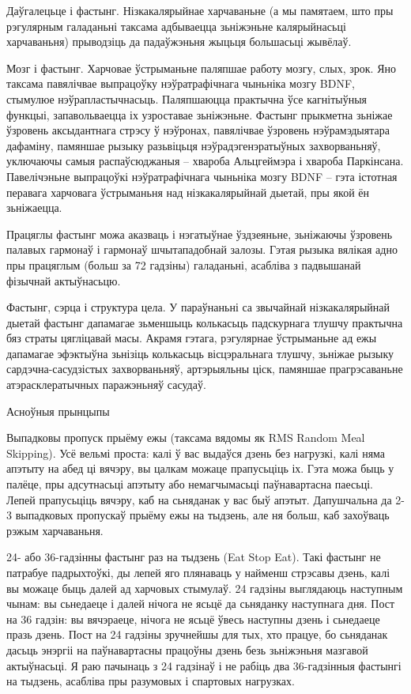 Даўгалецьце і фастынг.
Нізкакалярыйнае харчаваньне (а мы памятаем, што пры рэгулярным галаданьні таксама адбываецца зьніжэньне калярыйнасьці харчаваньня) прыводзіць да падаўжэньня жыцьця большасьці жывёлаў.

Мозг і фастынг.
Харчовае ўстрыманьне паляпшае работу мозгу, слых, зрок. Яно таксама павялічвае выпрацоўку нэўратрафічнага чыньніка мозгу BDNF, стымулюе нэўрапластычнасьць. Паляпшаюцца практычна ўсе кагнітыўныя функцыі, запавольваецца іх узроставае зьніжэньне. Фастынг прыкметна зьніжае ўзровень аксыдантнага стрэсу ў нэўронах, павялічвае ўзровень нэўрамэдыятара дафаміну, памяншае рызыку разьвіцьця нэўрадэгенэратыўных захворваньняў, уключаючы самыя распаўсюджаныя – хвароба Альцгеймэра і хвароба Паркінсана. Павелічэньне выпрацоўкі нэўратрафічнага чыньніка мозгу BDNF – гэта істотная перавага харчовага ўстрыманьня над нізкакалярыйнай дыетай, пры якой ён зьніжаецца.

Працяглы фастынг можа аказваць і нэгатыўнае ўздзеяньне, зьніжаючы ўзровень палавых гармонаў і гармонаў шчытападобнай залозы. Гэтая рызыка вялікая адно пры працяглым (больш за 72 гадзіны) галаданьні, асабліва з падвышанай фізычнай актыўнасьцю.

Фастынг, сэрца і структура цела.
У параўнаньні са звычайнай нізкакалярыйнай дыетай фастынг дапамагае зьменшыць колькасьць падскурнага тлушчу практычна бяз страты цягліцавай масы. Акрамя гэтага, рэгулярнае ўстрыманьне ад ежы дапамагае эфэктыўна зьнізіць колькасьць вісцэральнага тлушчу, зьніжае рызыку сардэчна-сасудзістых захворваньняў, артэрыяльны ціск, памяншае прагрэсаваньне атэрасклератычных паражэньняў сасудаў.

Асноўныя прынцыпы

Выпадковы пропуск прыёму ежы (таксама вядомы як RMS Random Meal Skipping).
Усё вельмі проста: калі ў вас выдаўся дзень без нагрузкі, калі няма апэтыту на абед ці вячэру, вы цалкам можаце прапусьціць іх. Гэта можа быць у палёце, пры адсутнасьці апэтыту або немагчымасьці паўнавартасна паесьці. Лепей прапусьціць вячэру, каб на сьняданак у вас быў апэтыт. Дапушчальна да 2-3 выпадковых пропускаў прыёму ежы на тыдзень, але ня больш, каб захоўваць рэжым харчаваньня.

24- або 36-гадзінны фастынг раз на тыдзень (Eat Stop Eat).
Такі фастынг не патрабуе падрыхтоўкі, ды лепей яго плянаваць у найменш стрэсавы дзень, калі вы можаце быць далей ад харчовых стымулаў. 24 гадзіны выглядаюць наступным чынам: вы сьнедаеце і далей нічога не ясьцё да сьняданку наступнага дня. Пост на 36 гадзін: вы вячэраеце, нічога не ясьцё ўвесь наступны дзень і сьнедаеце празь дзень. Пост на 24 гадзіны зручнейшы для тых, хто працуе, бо сьняданак дасьць энэргіі на паўнавартасны працоўны дзень безь зьніжэньня мазгавой актыўнасьці. Я раю пачынаць з 24 гадзінаў і не рабіць два 36-гадзінныя фастынгі на тыдзень, асабліва пры разумовых і спартовых нагрузках.

